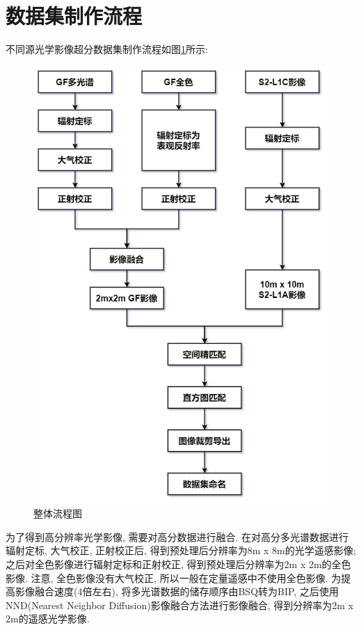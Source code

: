 \section{数据集制作流程}

不同源光学影像超分数据集制作流程如图\ref{fig:0101}所示:

\begin{figure}[htbp]
    \centering
    \includegraphics[height=0.7\textheight]{pic/cha01.png}
    \caption{整体流程图}
    \label{fig:0101}
\end{figure}

为了得到高分辨率光学影像, 需要对高分数据进行融合. 在对高分多光谱数据进行辐射定标, 大气校正, 正射校正后, 得到预处理后分辨率为8m x 8m的光学遥感影像; 之后对全色影像进行辐射定标和正射校正, 得到预处理后分辨率为2m x 2m的全色影像. 注意, 全色影像没有大气校正, 所以一般在定量遥感中不使用全色影像. 为提高影像融合速度(4倍左右), 将多光谱数据的储存顺序由BSQ转为BIP, 之后使用NND(Nearest Neighbor Diffusion)影像融合方法进行影像融合, 得到分辨率为2m x 2m的遥感光学影像.

